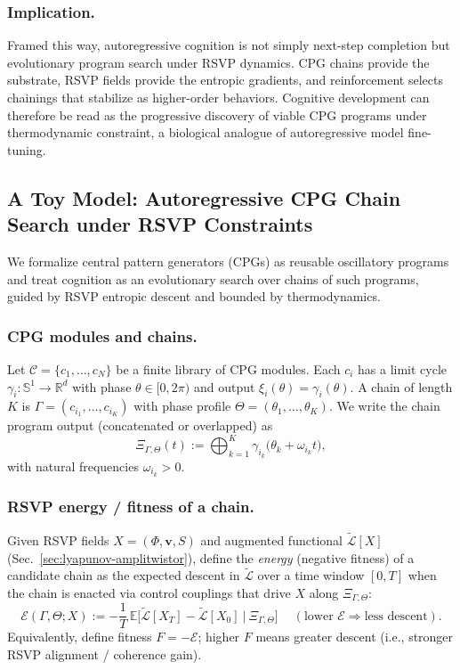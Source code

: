 \documentclass[a4paper,11pt]{article}
\begin{document}
\subsubsection{Implication.}
Framed this way, autoregressive cognition is not simply next-step completion
but evolutionary program search under RSVP dynamics. CPG chains provide the
substrate, RSVP fields provide the entropic gradients, and reinforcement
selects chainings that stabilize as higher-order behaviors. Cognitive
development can therefore be read as the progressive discovery of viable CPG
programs under thermodynamic constraint, a biological analogue of autoregressive
model fine-tuning.

\subsection{A Toy Model: Autoregressive CPG Chain Search under RSVP Constraints}
\label{sec:cpg-evo}

We formalize central pattern generators (CPGs) as reusable oscillatory
programs and treat cognition as an evolutionary search over chains of such
programs, guided by RSVP entropic descent and bounded by thermodynamics.

\subsubsection{CPG modules and chains.}
Let $\mathcal{C}=\{c_1,\dots,c_N\}$ be a finite library of CPG modules.
Each $c_i$ has a limit cycle $\gamma_i:\mathbb{S}^1\!\to\!\mathbb{R}^d$
with phase $\theta\in[0,2\pi)$ and output $\xi_i(\theta)=\gamma_i(\theta)$.
A chain of length $K$ is $\Gamma=(c_{i_1},\dots,c_{i_K})$ with
phase profile $\Theta=(\theta_1,\dots,\theta_K)$.
We write the chain program output (concatenated or overlapped) as
\begin{equation}
\Xi_{\Gamma,\Theta}(t):=\bigoplus_{k=1}^K \gamma_{i_k}\!\big(\theta_k+ \omega_{i_k} t\big),
\end{equation}
with natural frequencies $\omega_{i_k}>0$.

\subsubsection{RSVP energy / fitness of a chain.}
Given RSVP fields $X=(\Phi,\mathbf{v},S)$ and augmented functional
$\widetilde{\mathcal{L}}[X]$ (Sec.~\ref{sec:lyapunov-amplitwistor}), define
the \emph{energy} (negative fitness) of a candidate chain as the expected descent
in $\widetilde{\mathcal{L}}$ over a time window $[0,T]$ when the chain is enacted
via control couplings that drive $X$ along $\Xi_{\Gamma,\Theta}$:
\begin{equation}
\label{eq:cpg-energy}
\mathcal{E}(\Gamma,\Theta;X)
:=
-\frac{1}{T}\,\mathbb{E}\Big[\widetilde{\mathcal{L}}[X_T]-\widetilde{\mathcal{L}}[X_0]\ \big|\ \Xi_{\Gamma,\Theta}\Big]
\quad\ (\text{lower }\mathcal{E} \Rightarrow \text{less descent}).
\end{equation}
Equivalently, define fitness $F=-\mathcal{E}$; higher $F$ means greater descent
(i.e., stronger RSVP alignment / coherence gain).
\end{document}
